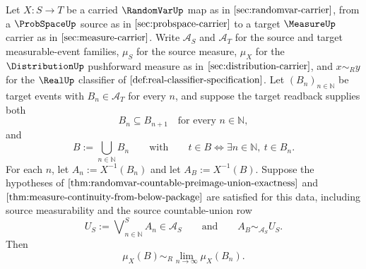 \begin{theorem}\label{thm:distribution-pushforward-continuity-from-below}
Let $X:S\to T$ be a carried $\RandomVarUp$ map as in $\autoref{sec:randomvar-carrier}$, from a $\ProbSpaceUp$ source as in $\autoref{sec:probspace-carrier}$ to a target $\MeasureUp$ carrier as in $\autoref{sec:measure-carrier}$. Write $\mathcal A_S$ and $\mathcal A_T$ for the source and target measurable-event families, $\mu_S$ for the source measure, $\mu_X$ for the $\DistributionUp$ pushforward measure as in $\autoref{sec:distribution-carrier}$, and $x\sim_R y$ for the $\RealUp$ classifier of $\autoref{def:real-classifier-specification}$. Let $(B_n)_{n\in\mathbb N}$ be target events with $B_n\in\mathcal A_T$ for every $n$, and suppose the target readback supplies both
$$
B_n\subseteq B_{n+1}\quad\text{for every }n\in\mathbb N,
$$
and
$$
B:=\bigcup_{n\in\mathbb N} B_n
\qquad\text{with}
\qquad
t\in B\Longleftrightarrow \exists n\in\mathbb N,\ t\in B_n.
$$
For each $n$, let $A_n:=X^{-1}(B_n)$ and let $A_B:=X^{-1}(B)$. Suppose the hypotheses of $\autoref{thm:randomvar-countable-preimage-union-exactness}$ and $\autoref{thm:measure-continuity-from-below-package}$ are satisfied for this data, including source measurability and the source countable-union row
$$
U_S:=\bigvee\nolimits^S_{n\in\mathbb N} A_n\in\mathcal A_S
\qquad\text{and}\qquad
A_B\sim_{\mathcal A_S}U_S.
$$
Then
$$
\mu_X(B)\sim_R\lim_{n\to\infty}\mu_X(B_n).
$$
\end{theorem}

